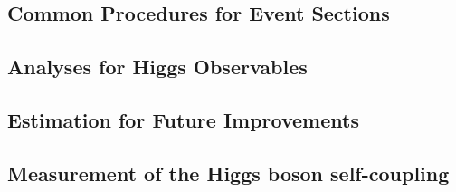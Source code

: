 


\subsection{Common Procedures for Event Sections}
\label{subsec:higgs_common}


\subsection{Analyses for Higgs Observables}
\label{subsec:higgs_ana}


% 

% 




\subsection{Estimation for Future Improvements}
\label{subsec:higgs_improve}


\subsection{Measurement of the Higgs boson self-coupling}
\label{subsec:higgsself}


